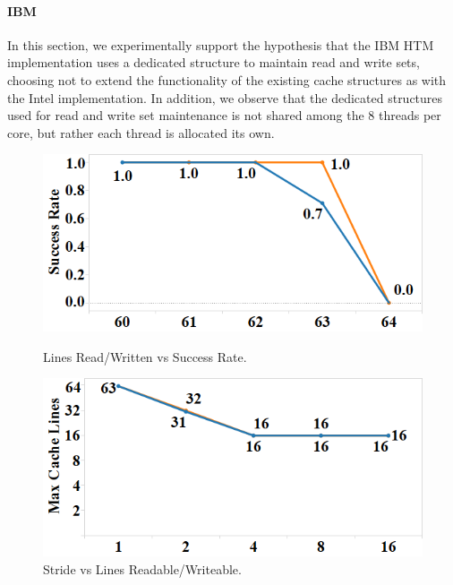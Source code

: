 \paragraph{IBM}

In this section, we experimentally support the hypothesis
that the IBM HTM implementation uses a dedicated structure
to maintain read and write sets, choosing not to extend the 
functionality of the existing cache structures as with
the Intel implementation.  In addition, we observe
that the dedicated structures used for read and write set
maintenance is not shared among the 8 threads per core, but rather
each thread is allocated its own.

\begin{figure}[h]%
\centering
\begin{minipage}[b]{.45\linewidth}
\centering
\includegraphics[width=\linewidth]{images/wttm_capacity_readwrite_ibm}
\caption{Lines Read/Written vs Success Rate.}
\label{fig:wttm_capacity_readwrite_ibm}
\end{minipage}%
\quad
\begin{minipage}[b]{.45\linewidth}%
\centering
\includegraphics[width=\linewidth]{images/wttm_stride_readwrite_ibm}
\caption{Stride vs Lines Readable/Writeable.}
\label{fig:wttm_stride_readwrite_ibm}
\end{minipage}
\end{figure}


